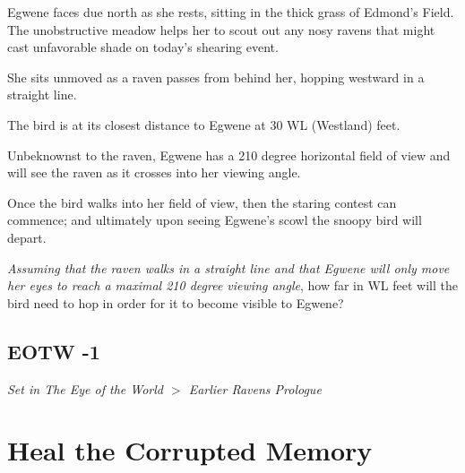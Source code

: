 \documentclass{article}
\begin{document}
Egwene faces due north
as she rests, sitting in the thick grass of Edmond's Field.
The unobstructive meadow helps her to scout out any nosy ravens
that might cast unfavorable shade on today's shearing event.

She sits unmoved
as a raven passes from behind her,
hopping westward in a straight line.

The bird is at its closest distance to Egwene at 30 WL (Westland) feet.

Unbeknownst to the raven, Egwene has a 210 degree horizontal field
of view and will see the raven as it crosses into her viewing angle.

Once the bird walks into her field of view, then the staring contest
can commence; and ultimately upon seeing Egwene's scowl
the snoopy bird will depart.

\textit{Assuming that the raven walks in a straight line
and that Egwene will only move her eyes
to reach a maximal 210 degree viewing angle},
how far in WL feet will the bird need to hop
in order for it to become visible to Egwene?


\subsection*{EOTW -1}  %
\textit{ Set in The Eye of the World $>$ Earlier Ravens Prologue } \pagebreak

\section*{Heal the Corrupted Memory}

\end{document}
